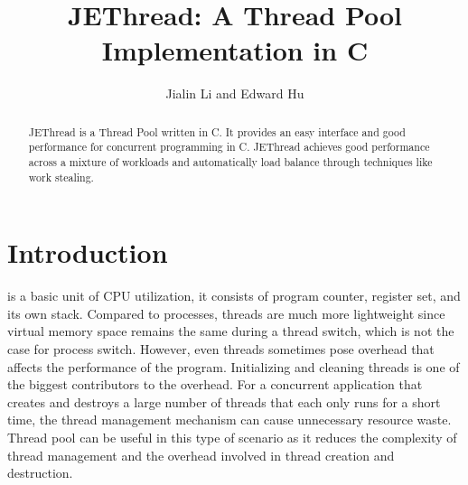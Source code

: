 \documentclass[journal, a4paper]{IEEEtran}
\begin{document}
	\title{JEThread: A Thread Pool Implementation in C}
	\author{Jialin Li and Edward Hu}
	\maketitle

\begin{abstract}
	JEThread is a Thread Pool written in C. It provides an easy interface and good performance for concurrent programming in C. JEThread achieves good performance across a mixture of workloads and automatically load balance through techniques like work stealing.
\end{abstract}

\section{Introduction}
	 is a basic unit of CPU utilization, it consists of program counter, register set, and its own stack. Compared to processes, threads are much more lightweight since virtual memory space remains the same during a thread switch, which is not the case for process switch. However, even threads sometimes pose overhead that affects the performance of the program. Initializing and cleaning threads is one of the biggest contributors to the overhead. For a concurrent application that creates and destroys a large number of threads that each only runs for a short time, the thread management mechanism can cause unnecessary resource waste. Thread pool can be useful in this type of scenario as it reduces the complexity of thread management and the overhead involved in thread creation and destruction. 

\end{document}
